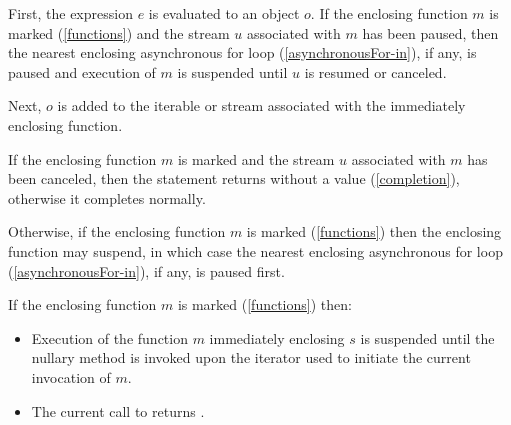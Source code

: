 \documentclass[makeidx]{article}
\begin{document}
{\LMHash{}%
First, the expression $e$ is evaluated to an object $o$.
If the enclosing function $m$ is marked \code{\ASYNC*} (\ref{functions}) and the stream $u$ associated with $m$ has been paused, then the nearest enclosing asynchronous for loop (\ref{asynchronousFor-in}), if any, is paused and execution of $m$ is suspended until $u$ is resumed or canceled.

\LMHash{}%
Next, $o$ is added to the iterable or stream associated with the immediately enclosing function.

\LMHash{}%
If the enclosing function $m$ is marked \code{\ASYNC*} and the stream $u$ associated with $m$ has been canceled, then the \YIELD{} statement returns without a value (\ref{completion}), otherwise it completes normally.


\LMHash{}%
Otherwise, if the enclosing function $m$ is marked \code{\ASYNC*} (\ref{functions}) then the enclosing function may suspend, in which case the nearest enclosing asynchronous for loop (\ref{asynchronousFor-in}), if any, is paused first.


\LMHash{}%
If the enclosing function $m$ is marked \code{\SYNC*} (\ref{functions}) then:
\begin{itemize}
\item
Execution of the function $m$ immediately enclosing $s$ is suspended until the nullary method  is invoked upon the iterator used to initiate the current invocation of $m$.
\item
The current call to  returns \TRUE.
\end{itemize}

}
\end{document}
